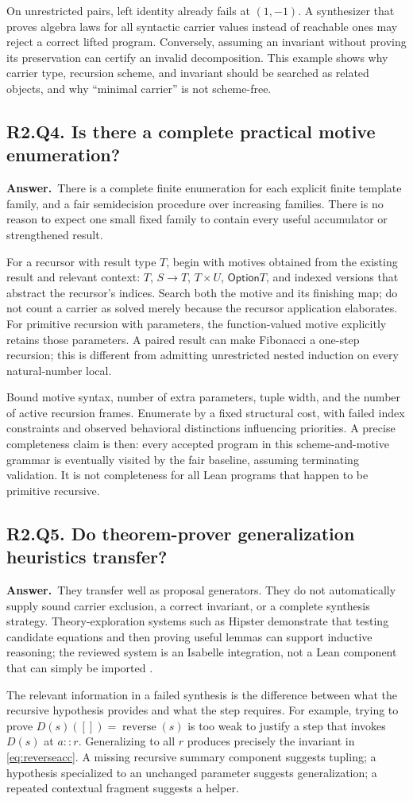 \documentclass[11pt,a4paper]{article}
\theoremstyle{definition}
\theoremstyle{remark}
\newcommand{\Option}{\mathsf{Option}}
\newcommand{\rev}{\operatorname{reverse}}
\newcommand{\answer}{\par\noindent\textbf{Answer.}\ }
\newcommand{\qheading}[2]{\subsection{#1. #2}}
\begin{document}
On unrestricted pairs, left identity already fails at $(1,-1)$. A synthesizer
that proves algebra laws for all syntactic carrier values instead of reachable
ones may reject a correct lifted program. Conversely, assuming an invariant
without proving its preservation can certify an invalid decomposition.
This example shows why carrier type, recursion scheme, and invariant should be
searched as related objects, and why ``minimal carrier'' is not scheme-free.

\qheading{R2.Q4}{Is there a complete practical motive enumeration?}
\answer There is a complete finite enumeration for each explicit finite template
family, and a fair semidecision procedure over increasing families. There is
no reason to expect one small fixed family to contain every useful accumulator
or strengthened result.

For a recursor with result type $T$, begin with motives obtained from the
existing result and relevant context: $T$, $S\to T$, $T\times U$,
$\Option T$, and indexed versions that abstract the recursor's indices. Search
both the motive and its finishing map; do not count a carrier as solved merely
because the recursor application elaborates. For primitive recursion with
parameters, the function-valued motive explicitly retains those parameters.
A paired result can make Fibonacci a one-step recursion; this is different
from admitting unrestricted nested induction on every natural-number local.

Bound motive syntax, number of extra parameters, tuple width, and the number
of active recursion frames. Enumerate by a fixed structural cost, with failed
index constraints and observed behavioral distinctions influencing priorities.
A precise completeness claim is then: every accepted program in this
scheme-and-motive grammar is eventually visited by the fair baseline, assuming
terminating validation. It is not completeness for all Lean programs that
happen to be primitive recursive.

\qheading{R2.Q5}{Do theorem-prover generalization heuristics transfer?}
\answer They transfer well as proposal generators. They do not automatically
supply sound carrier exclusion, a correct invariant, or a complete synthesis
strategy. Theory-exploration systems such as Hipster demonstrate that testing
candidate equations and then proving useful lemmas can support inductive
reasoning; the reviewed system is an Isabelle integration, not a Lean component
that can simply be imported \cite{hipster}.

The relevant information in a failed synthesis is the difference between what
the recursive hypothesis provides and what the step requires. For example,
trying to prove $D(s)([])=\rev(s)$ is too weak to justify a step that invokes
$D(s)$ at $a::r$. Generalizing to all $r$ produces precisely the invariant in
\eqref{eq:reverseacc}. A missing recursive summary component suggests tupling;
a hypothesis specialized to an unchanged parameter suggests generalization;
a repeated contextual fragment suggests a helper.
\end{document}
